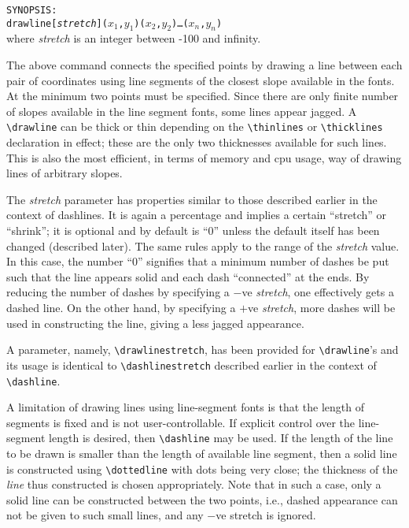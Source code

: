 {\tt SYNOPSIS:\\
\hspace*{\leftmargin}%
\bs drawline[{\it stretch}]($x_1$,$y_1$)($x_2$,$y_2$)\ldots($x_n$,$y_n$)}\\
where {\it stretch\/} is an integer between -100 and infinity.

The above command connects the specified points by drawing a line between
each pair of coordinates using line segments of the closest slope available
in the fonts. At the minimum two points must be specified. Since there are
only finite number of slopes available in the line segment fonts, some lines
appear jagged. A \verb|\drawline| can be thick or thin depending on the
\verb|\thinlines| or \verb|\thicklines| declaration in effect; these are the
only two thicknesses available for such lines. This is also the most
efficient, in terms of memory and cpu usage, way of drawing lines of
arbitrary slopes.

The {\it stretch\/} parameter has properties similar to those described
earlier in the context of dashlines. It is again a percentage and implies a
certain ``stretch'' or ``shrink''; it is optional and by default is ``0''
unless the default itself has been changed (described later). The same rules
apply to the range of the {\it stretch\/} value. In this case, the number
``0'' signifies that a minimum number of dashes be put such that the line
appears solid and each dash ``connected'' at the ends. By reducing the number
of dashes by specifying a $-$ve {\it stretch\/}, one effectively gets a
dashed line. On the other hand, by specifying a $+$ve {\it stretch\/}, more
dashes will be used in constructing the line, giving a less jagged
appearance.

A parameter, namely, \verb|\drawlinestretch|, has been provided for
\verb|\drawline|'s and its usage is identical to \verb|\dashlinestretch|
described earlier in the context of \verb|\dashline|.

A limitation of drawing lines using line-segment fonts is that the length of
segments is fixed and is not user-controllable. If explicit control over the
line-segment length is desired, then \verb|\dashline| may be used.
If the length of the line to be drawn is smaller than the length of available
line segment, then a solid line is constructed using \verb|\dottedline| with
dots being very close; the thickness of the {\it line\/} thus constructed is
chosen appropriately. Note that in such a case, only a solid line can be
constructed between the two points, i.e., dashed appearance can not
be given to such small lines, and any $-$ve stretch is ignored.

